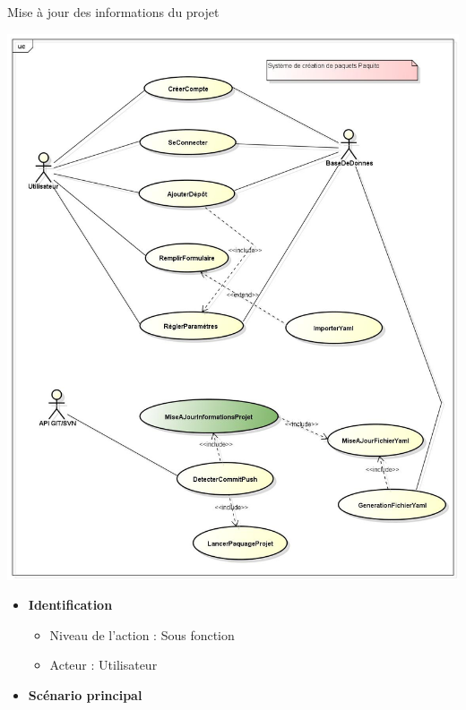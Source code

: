 \documentclass[9pt,xcolor=dvipsnames]{beamer}
\begin{document}
\begin{frame}{Mise à jour des informations du projet}
  \begin{minipage}{0.40\textwidth}
    \begin{flushleft}
      \includegraphics[scale=\largeur]{../img/Diagram_miseAJourInformationsProjet.jpg}
    \end{flushleft}
  \end{minipage}
  \hfill
  \begin{minipage}{0.5\textwidth}
    \begin{flushright}
      \begin{itemize}
      \item \textbf{Identification}
        \begin{itemize}
        \item[] Niveau de l'action : Sous fonction
        \item[] Acteur : Utilisateur
        \end{itemize}
      \item \textbf{Scénario principal}

\end{itemize}
\end{flushright}
\end{minipage}
\end{frame}
\end{document}
